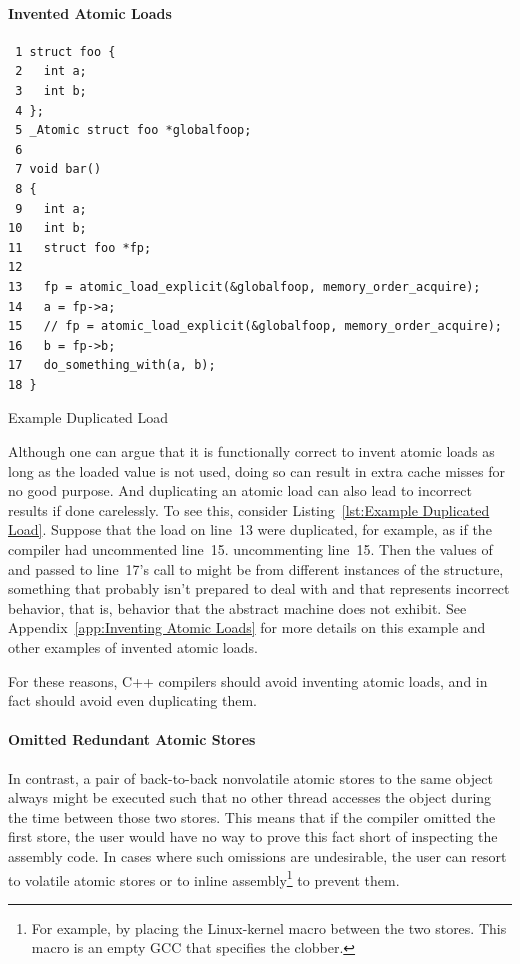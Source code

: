 \documentclass[10]{article}
\begin{document}
\paragraph{Invented Atomic Loads}
\begin{listing}[tbp]
\scriptsize
\begin{verbatim}
 1 struct foo {
 2   int a;
 3   int b;
 4 };
 5 _Atomic struct foo *globalfoop;
 6
 7 void bar()
 8 {
 9   int a;
10   int b;
11   struct foo *fp;
12
13   fp = atomic_load_explicit(&globalfoop, memory_order_acquire);
14   a = fp->a;
15   // fp = atomic_load_explicit(&globalfoop, memory_order_acquire);
16   b = fp->b;
17   do_something_with(a, b);
18 }
\end{verbatim}
\caption{Example Duplicated Load}
\label{lst:Example Duplicated Load}
\end{listing}
Although one can argue that it is functionally correct to invent atomic
loads as long as the loaded value is not used, doing so can result in
extra cache misses for no good purpose.
And duplicating an atomic load can also lead to incorrect results if done
carelessly.
To see this, consider
Listing~\ref{lst:Example Duplicated Load}.
Suppose that the load on line~13 were duplicated, for example, as if the
compiler had uncommented line~15.
uncommenting line~15.
Then the values of  and  passed to line~17's call to
 might be from different instances of the
 structure, something that  probably
isn't prepared to deal with and that represents incorrect behavior,
that is, behavior that the abstract machine does not exhibit.
See
Appendix~\ref{app:Inventing Atomic Loads}
for more details on this example and other examples of invented
atomic loads.

For these reasons, C++ compilers should avoid inventing atomic
loads, and in fact should avoid even duplicating them.

\paragraph{Omitted Redundant Atomic Stores}
In contrast, a pair of back-to-back nonvolatile atomic stores to the
same object
always might be executed such that no other thread accesses the object
during the time between those two stores.
This means that if the compiler omitted the first store,
the user would have no way to prove this fact short of
inspecting the assembly code.
In cases where such omissions are undesirable, the user can resort to
volatile atomic stores or to inline assembly\footnote{
	For example, by placing the Linux-kernel  macro
	between the two stores.
	This macro is an empty GCC  that specifies the 
	clobber.}
to prevent them.
\end{document}
